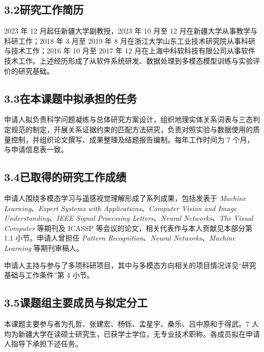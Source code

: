 \subsection*{3.2\quad 研究工作简历}

2023 年 12 月起任新疆大学副教授，2023 年 10 月至 12 月在新疆大学从事教学与科研工作；2018 年 3 月至 2019 年 8 月在浙江大学山东工业技术研究院从事科研与技术工作；2016 年 10 月至 2017 年 12 月在上海中科软科技有限公司从事软件技术工作。上述经历形成了从软件系统研发、数据处理到多模态模型训练与实验评价的研究基础。

\subsection*{3.3\quad 在本课题中拟承担的任务}

申请人拟负责科学问题凝练与总体研究方案设计，组织地理实体关系词表与三态判定规范的制定，开展关系证据约束的匹配方法研究，负责对照实验与数据使用的质量控制，并组织论文撰写、成果整理及结题报告编制。每年工作时间为 7 个月，与申请信息表一致。

\subsection*{3.4\quad 已取得的研究工作成绩}

申请人围绕多模态学习与遥感视觉理解形成了系列成果，包括发表于 \textit{Machine Learning}、\textit{Expert Systems with Applications}、\textit{Computer Vision and Image Understanding}、\textit{IEEE Signal Processing Letters}、\textit{Neural Networks}、\textit{The Visual Computer} 等期刊及 ICASSP 等会议的论文，相关代表作与本人贡献见本部分第 1.1 小节。申请人曾担任 \textit{Pattern Recognition}、\textit{Neural Networks}、\textit{Machine Learning} 等期刊审稿人。

申请人主持与参与了多项科研项目，其中与多模态方向相关的项目情况详见“研究基础与工作条件”第 4 小节。


\subsection*{3.5\quad 课题组主要成员与拟定分工}

本课题主要参与者为孔哲、张建宏、杨铄、孟星宇、桑乐、吕中原和于得武。7 人均为新疆大学在读硕士研究生，已获学士学位，无专业技术职称。各成员拟在申请人指导下承担下述任务。

